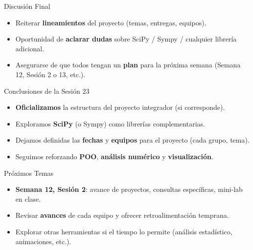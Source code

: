 \documentclass[10pt]{beamer}
\begin{document}
\begin{frame}{Discusión Final}
  \begin{itemize}
    \item Reiterar \textbf{lineamientos} del proyecto (temas, entregas, equipos).
    \item Oportunidad de \textbf{aclarar dudas} sobre SciPy / Sympy / cualquier librería adicional.
    \item Asegurarse de que todos tengan un \textbf{plan} para la próxima semana (Semana 12, Sesión 2 o 13, etc.).
  \end{itemize}
\end{frame}

\begin{frame}{Conclusiones de la Sesión 23}
  \begin{itemize}
    \item \textbf{Oficializamos} la estructura del proyecto integrador (si corresponde).
    \item Exploramos \textbf{SciPy} (o Sympy) como librerías complementarias.
    \item Dejamos definidas las \textbf{fechas} y \textbf{equipos} para el proyecto (cada grupo, tema).
    \item Seguimos reforzando \textbf{POO}, \textbf{análisis numérico} y \textbf{visualización}.
  \end{itemize}
\end{frame}

\begin{frame}{Próximos Temas}
  \begin{itemize}
    \item \textbf{Semana 12, Sesión 2}: avance de proyectos, consultas específicas, mini-lab en clase.
    \item Revisar \textbf{avances} de cada equipo y ofrecer retroalimentación temprana.
    \item Explorar otras herramientas si el tiempo lo permite (análisis estadístico, animaciones, etc.).
  \end{itemize}
\end{frame}
\end{document}
